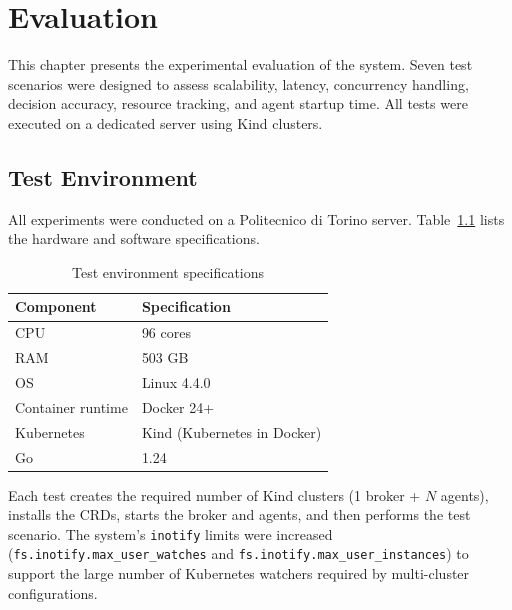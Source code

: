 
\chapter{Evaluation}
\label{ch:evaluation}

This chapter presents the experimental evaluation of the system. Seven test scenarios were designed to assess scalability, latency, concurrency handling, decision accuracy, resource tracking, and agent startup time. All tests were executed on a dedicated server using Kind clusters.


\section{Test Environment}
\label{sec:test-env}

All experiments were conducted on a Politecnico di Torino server. Table~\ref{tab:test-env} lists the hardware and software specifications.

\begin{table}[htbp]
\centering
\caption{Test environment specifications}
\label{tab:test-env}
\begin{tabular}{@{}ll@{}}
\toprule
\textbf{Component} & \textbf{Specification} \\
\midrule
CPU & 96 cores \\
RAM & 503 GB \\
OS & Linux 4.4.0 \\
Container runtime & Docker 24+ \\
Kubernetes & Kind (Kubernetes in Docker) \\
Go & 1.24 \\
\bottomrule
\end{tabular}
\end{table}

Each test creates the required number of Kind clusters (1 broker + $N$ agents), installs the CRDs, starts the broker and agents, and then performs the test scenario. The system's \texttt{inotify} limits were increased (\texttt{fs.inotify.max\_user\_watches} and \texttt{fs.inotify.max\_user\_instances}) to support the large number of Kubernetes watchers required by multi-cluster configurations.

